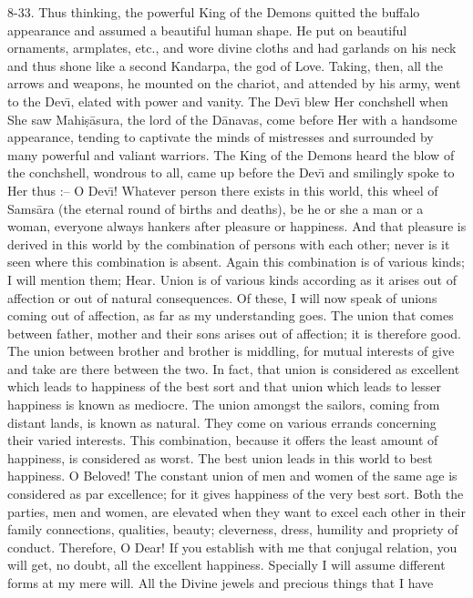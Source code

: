 8-33. Thus thinking, the powerful King of the Demons quitted the buffalo appearance and assumed a beautiful human shape. He put on beautiful ornaments, armplates, etc., and wore divine cloths and had garlands on his neck and thus shone like a second Kandarpa, the god of Love. Taking, then, all the arrows and weapons, he mounted on the chariot, and attended by his army, went to the Dev\={\i}, elated with power and vanity. The Dev\={\i} blew Her conchshell when She saw Mahi\d{s}\=asura, the lord of the D\=anavas, come before Her with a handsome appearance, tending to captivate the minds of mistresses and surrounded by many powerful and valiant warriors. The King of the Demons heard the blow of the conchshell, wondrous to all, came up before the Dev\={\i} and smilingly spoke to Her thus :-- O Dev\={\i}! Whatever person there exists in this world, this wheel of Sams\=ara (the eternal round of births and deaths), be he or she a man or a woman, everyone always hankers after pleasure or happiness. And that pleasure is derived in this world by the combination of persons with each other; never is it seen where this combination is absent. Again this combination is of various kinds; I will mention them; Hear. Union is of various kinds according as it arises out of affection or out of natural consequences. Of these, I will now speak of unions coming out of affection, as far as my understanding goes. The union that comes between father, mother and their sons arises out of affection; it is therefore good. The union between brother and brother is middling, for mutual interests of give and take are there between the two. In fact, that union is considered as excellent which leads to happiness of the best sort and that union which leads to lesser happiness is known as mediocre. The union amongst the sailors, coming from distant lands, is known as natural. They come on various errands concerning their varied interests. This combination, because it offers the least amount of happiness, is considered as worst. The best union leads in this world to best happiness. O Beloved! The constant union of men and women of the same age is considered as par excellence; for it gives happiness of the very best sort. Both the parties, men and women, are elevated when they want to excel each other in their family connections, qualities, beauty; cleverness, dress, humility and propriety of conduct. Therefore, O Dear! If you establish with me that conjugal relation, you will get, no doubt, all the excellent happiness. Specially I will assume different forms at my mere will. All the Divine jewels and precious things that I have

